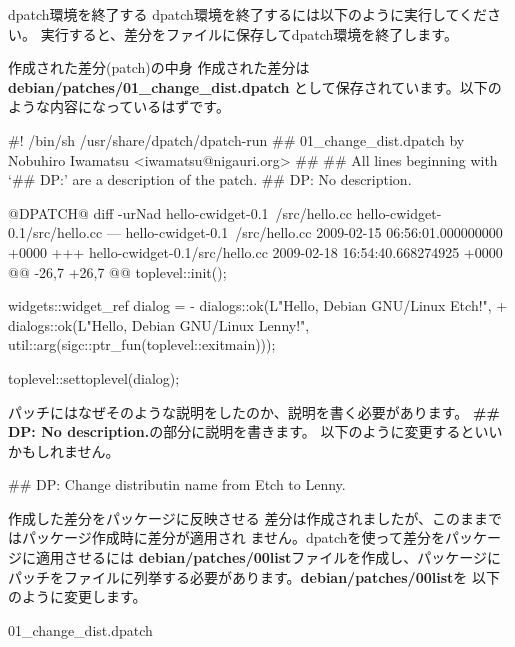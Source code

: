 \begin{frame}[containsverbatim]{dpatch環境を終了する}
dpatch環境を終了するには以下のように実行してください。
実行すると、差分をファイルに保存してdpatch環境を終了します。
\end{frame}

\begin{frame}[containsverbatim]{作成された差分(patch)の中身}
作成された差分は\\
{\bf debian/patches/01\_change\_dist.dpatch}
として保存されています。以下のような内容になっているはずです。
\begin{commandline}
#! /bin/sh /usr/share/dpatch/dpatch-run
## 01_change_dist.dpatch by Nobuhiro Iwamatsu <iwamatsu@nigauri.org>
##
## All lines beginning with `## DP:' are a description of the patch.
## DP: No description.

@DPATCH@
diff -urNad hello-cwidget-0.1~/src/hello.cc hello-cwidget-0.1/src/hello.cc
--- hello-cwidget-0.1~/src/hello.cc 2009-02-15 06:56:01.000000000 +0000
+++ hello-cwidget-0.1/src/hello.cc  2009-02-18 16:54:40.668274925 +0000
@@ -26,7 +26,7 @@
    toplevel::init();

    widgets::widget_ref dialog =
-       dialogs::ok(L"Hello, Debian GNU/Linux Etch!",
+       dialogs::ok(L"Hello, Debian GNU/Linux Lenny!",
            util::arg(sigc::ptr_fun(toplevel::exitmain)));

    toplevel::settoplevel(dialog);
\end{commandline}
\end{frame}

\begin{frame}[containsverbatim]
パッチにはなぜそのような説明をしたのか、説明を書く必要があります。
{\bf \#\# DP: No description.}の部分に説明を書きます。
以下のように変更するといいかもしれません。
\begin{commandline}
## DP: Change distributin name from Etch to Lenny.
\end{commandline}
\end{frame}

\begin{frame}[containsverbatim]{作成した差分をパッケージに反映させる}
差分は作成されましたが、このままではパッケージ作成時に差分が適用され
ません。dpatchを使って差分をパッケージに適用させるには{\bf
debian/patches/00list}ファイルを作成し、パッケージに
パッチをファイルに列挙する必要があります。{\bf debian/patches/00list}を
以下のように変更します。
\begin{commandline}
01_change_dist.dpatch
\end{commandline}
\end{frame}

